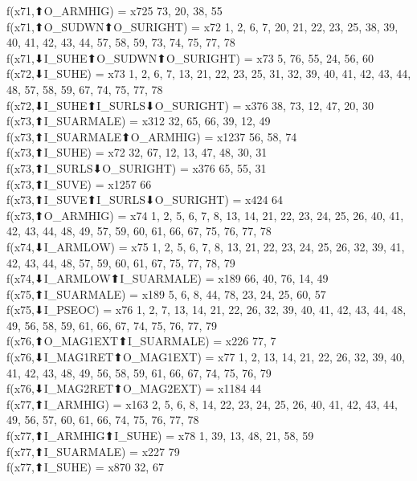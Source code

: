 f(x71,⬆O_ARMHIG) = x725 {73, 20, 38, 55} \\
f(x71,⬆O_SUDWN⬆O_SURIGHT) = x72 {1, 2, 6, 7, 20, 21, 22, 23, 25, 38, 39, 40, 41, 42, 43, 44, 57, 58, 59, 73, 74, 75, 77, 78} \\
f(x71,⬇I_SUHE⬆O_SUDWN⬆O_SURIGHT) = x73 {5, 76, 55, 24, 56, 60} \\
f(x72,⬇I_SUHE) = x73 {1, 2, 6, 7, 13, 21, 22, 23, 25, 31, 32, 39, 40, 41, 42, 43, 44, 48, 57, 58, 59, 67, 74, 75, 77, 78} \\
f(x72,⬇I_SUHE⬆I_SURLS⬇O_SURIGHT) = x376 {38, 73, 12, 47, 20, 30} \\
f(x73,⬆I_SUARMALE) = x312 {32, 65, 66, 39, 12, 49} \\
f(x73,⬆I_SUARMALE⬆O_ARMHIG) = x1237 {56, 58, 74} \\
f(x73,⬆I_SUHE) = x72 {32, 67, 12, 13, 47, 48, 30, 31} \\
f(x73,⬆I_SURLS⬇O_SURIGHT) = x376 {65, 55, 31} \\
f(x73,⬆I_SUVE) = x1257 {66} \\
f(x73,⬆I_SUVE⬆I_SURLS⬇O_SURIGHT) = x424 {64} \\
f(x73,⬆O_ARMHIG) = x74 {1, 2, 5, 6, 7, 8, 13, 14, 21, 22, 23, 24, 25, 26, 40, 41, 42, 43, 44, 48, 49, 57, 59, 60, 61, 66, 67, 75, 76, 77, 78} \\
f(x74,⬇I_ARMLOW) = x75 {1, 2, 5, 6, 7, 8, 13, 21, 22, 23, 24, 25, 26, 32, 39, 41, 42, 43, 44, 48, 57, 59, 60, 61, 67, 75, 77, 78, 79} \\
f(x74,⬇I_ARMLOW⬆I_SUARMALE) = x189 {66, 40, 76, 14, 49} \\
f(x75,⬆I_SUARMALE) = x189 {5, 6, 8, 44, 78, 23, 24, 25, 60, 57} \\
f(x75,⬇I_PSEOC) = x76 {1, 2, 7, 13, 14, 21, 22, 26, 32, 39, 40, 41, 42, 43, 44, 48, 49, 56, 58, 59, 61, 66, 67, 74, 75, 76, 77, 79} \\
f(x76,⬆O_MAG1EXT⬆I_SUARMALE) = x226 {77, 7} \\
f(x76,⬇I_MAG1RET⬆O_MAG1EXT) = x77 {1, 2, 13, 14, 21, 22, 26, 32, 39, 40, 41, 42, 43, 48, 49, 56, 58, 59, 61, 66, 67, 74, 75, 76, 79} \\
f(x76,⬇I_MAG2RET⬆O_MAG2EXT) = x1184 {44} \\
f(x77,⬆I_ARMHIG) = x163 {2, 5, 6, 8, 14, 22, 23, 24, 25, 26, 40, 41, 42, 43, 44, 49, 56, 57, 60, 61, 66, 74, 75, 76, 77, 78} \\
f(x77,⬆I_ARMHIG⬆I_SUHE) = x78 {1, 39, 13, 48, 21, 58, 59} \\
f(x77,⬆I_SUARMALE) = x227 {79} \\
f(x77,⬆I_SUHE) = x870 {32, 67} \\

